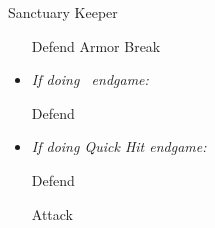 \begin{battle}[40000]{Sanctuary Keeper}
\begin{itemize}
	\yunaf Defend
	\tidusf Armor Break
	\item \textit{If doing \bahamut\ endgame:}
	\begin{itemize}
		\auronf Defend
	\end{itemize}
	\item \textit{If doing Quick Hit endgame:}
	\begin{itemize}
		\switch{\auron}{\rikku}
		\rikkuf Defend
	\end{itemize}
	\summon{\bahamut}
	\bahamutf Attack
\end{itemize}
\end{battle}